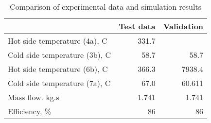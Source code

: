 \begin{table}
\label{tab:Comparison}
\caption{Comparison of experimental data and simulation results}
\begin{center}
\begin{tabulary}{0.9\textwidth}{LRR}
\toprule
& Test data \cite{Iverson_2013}  & Validation \\
\midrule
Hot side temperature (4a), C & 331.7 &  \\
Cold side temperature (3b), C & 58.7 & 58.7 \\
Hot side temperature (6b), C & 366.3 & 7938.4 \\
Cold side temperature (7a), C & 67.0 & 60.611 \\
Mass flow. kg.s & 1.741 & 1.741 \\
Efficiency, \% & 86 & 86 \\
\bottomrule
\end{tabulary}
\end{center}
\end{table}